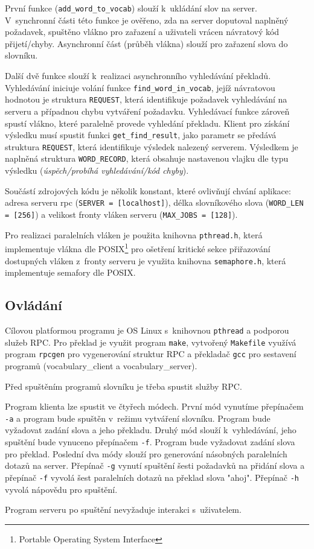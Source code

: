 \documentclass[12pt, a4paper]{article}
\begin{document}
První funkce (\texttt{add\_word\_to\_vocab}) slouží k~ukládání slov na server. V~synchronní části této funkce je ověřeno, zda na server doputoval naplněný požadavek, spuštěno vlákno pro zařazení a uživateli vrácen návratový kód přijetí/chyby. Asynchronní část (průběh vlákna) slouží pro zařazení slova do slovníku. 

Další dvě funkce slouží k~realizaci asynchronního vyhledávání překladů. Vyhledávání iniciuje volání funkce \texttt{find\_word\_in\_vocab}, jejíž návratovou hodnotou je struktura \texttt{REQUEST}, která identifikuje požadavek vyhledávání na serveru a případnou chybu vytváření požadavku. Vyhledávací funkce zároveň spustí vlákno, které paralelně provede vyhledání překladu. Klient pro získání výsledku musí spustit funkci \texttt{get\_find\_result}, jako parametr se předává struktura \texttt{REQUEST}, která identifikuje výsledek nalezený serverem. Výsledkem je naplněná struktura \texttt{WORD\_RECORD}, která obsahuje nastavenou vlajku dle typu výsledku (\emph{úspěch/probíhá vyhledávání/kód chyby}).

Součástí zdrojových kódu je několik konstant, které ovlivňují chvání aplikace: adresa serveru rpc (\texttt{SERVER = [localhost]}), délka slovníkového slova (\texttt{WORD\_LEN = [256]}) a velikost fronty vláken serveru (\texttt{MAX\_JOBS = [128]}).

Pro realizaci paralelních vláken je použita knihovna \texttt{pthread.h}, která implementuje vlákna dle POSIX\footnote{Portable Operating System Interface} pro ošetření kritické sekce přiřazování dostupných vláken z~fronty serveru je využita knihovna \texttt{semaphore.h}, která implementuje semafory dle POSIX.

\subsection{Ovládání}

Cílovou platformou programu je OS Linux s~knihovnou \texttt{pthread} a podporou služeb RPC. Pro překlad je využit program \texttt{make}, vytvořený \texttt{Makefile} využívá program \texttt{rpcgen} pro vygenerování struktur RPC a překladač \texttt{gcc} pro sestavení programů (vocabulary\_client a vocabulary\_server).

Před spuštěním programů slovníku je třeba spustit služby RPC. 

Program klienta lze spustit ve čtyřech módech. První mód vynutíme přepínačem \texttt{-a} a program bude spuštěn v~režimu vytváření slovníku. Program bude vyžadovat zadání slova a jeho překladu. Druhý mód slouží k~vyhledávání, jeho spuštění bude vynuceno přepínačem \texttt{-f}. Program bude vyžadovat zadání slova pro překlad. Poslední dva módy slouží pro generování násobných paralelních dotazů na server. Přepínač \texttt{-g} vynutí spuštění šesti požadavků na přidání slova a přepínač \texttt{-f} vyvolá šest paralelních dotazů na překlad slova "ahoj". Přepínač \texttt{-h} vyvolá nápovědu pro spuštění.

Program serveru po spuštění nevyžaduje interakci s~uživatelem.
\end{document}
